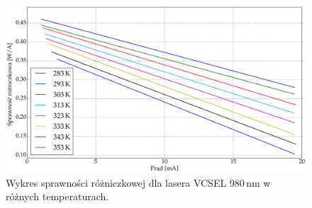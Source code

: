 \begin{figure}
\center
  \includegraphics[scale=0.25]{plot980/plot_eff_via_current_all.eps}
  \caption{Wykres sprawności różniczkowej dla lasera VCSEL 980\,nm w różnych temperaturach.}
  \label{fig:plot_eff_via_current_all_980}
\end{figure}